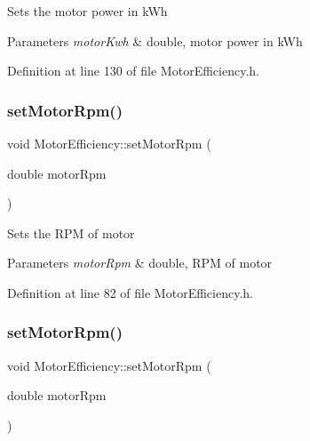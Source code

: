 Sets the motor power in k\+Wh 
\begin{DoxyParams}{Parameters}
{\em motor\+Kwh} & double, motor power in k\+Wh \\
\hline
\end{DoxyParams}


Definition at line 130 of file Motor\+Efficiency.\+h.

\mbox{\label{class_motor_efficiency_a2c4ddf9f2f3e44c098dad91a0ddbaf21}} 
\subsubsection{\texorpdfstring{set\+Motor\+Rpm()}{setMotorRpm()}\hspace{0.1cm}{\footnotesize\ttfamily [1/3]}}
{\footnotesize\ttfamily void Motor\+Efficiency\+::set\+Motor\+Rpm (\begin{DoxyParamCaption}\item[{double}]{motor\+Rpm }\end{DoxyParamCaption})\hspace{0.3cm}{\ttfamily [inline]}}

Sets the R\+PM of motor 
\begin{DoxyParams}{Parameters}
{\em motor\+Rpm} & double, R\+PM of motor \\
\hline
\end{DoxyParams}


Definition at line 82 of file Motor\+Efficiency.\+h.

\mbox{\label{class_motor_efficiency_a2c4ddf9f2f3e44c098dad91a0ddbaf21}} 
\subsubsection{\texorpdfstring{set\+Motor\+Rpm()}{setMotorRpm()}\hspace{0.1cm}{\footnotesize\ttfamily [2/3]}}
{\footnotesize\ttfamily void Motor\+Efficiency\+::set\+Motor\+Rpm (\begin{DoxyParamCaption}\item[{double}]{motor\+Rpm }\end{DoxyParamCaption})\hspace{0.3cm}{\ttfamily [inline]}}

